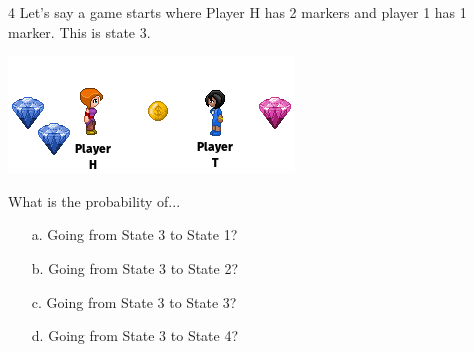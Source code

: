 \documentclass[a4paper,12pt]{book}
\newcounter{question}
\begin{document}
        \begin{question}{\thequestion}{4}
            Let's say a game starts where Player H has 2 markers and
            player 1 has 1 marker. This is state 3.

            \begin{center}
                \includegraphics{images/6-6-game.png}
            \end{center}

            What is the probability of...

            \begin{itemize}
                \item[a.] Going from State 3 to State 1?
                \item[b.] Going from State 3 to State 2?
                \item[c.] Going from State 3 to State 3?
                \item[d.] Going from State 3 to State 4?
            \end{itemize}
            
        \end{question}


        \notonkey{ \newpage }{ \hrulefill }
        
\end{document}
